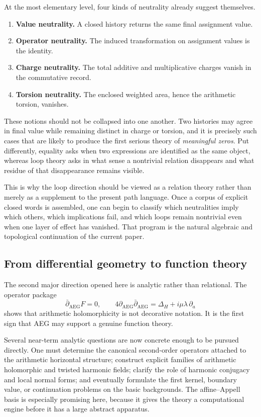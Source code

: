 At the most elementary level, four kinds of neutrality already suggest themselves.

\begin{enumerate}
    \item \textbf{Value neutrality.} A closed history returns the same final assignment value.
    \item \textbf{Operator neutrality.} The induced transformation on assignment values is the identity.
    \item \textbf{Charge neutrality.} The total additive and multiplicative charges vanish in the commutative record.
    \item \textbf{Torsion neutrality.} The enclosed weighted area, hence the arithmetic torsion, vanishes.
\end{enumerate}

These notions should not be collapsed into one another. Two histories may agree in final value while remaining distinct in charge or torsion, and it is precisely such cases that are likely to produce the first serious theory of \emph{meaningful zeros}. Put differently, equality asks when two expressions are identified as the same object, whereas loop theory asks in what sense a nontrivial relation disappears and what residue of that disappearance remains visible.

This is why the loop direction should be viewed as a relation theory rather than merely as a supplement to the present path language. Once a corpus of explicit closed words is assembled, one can begin to classify which neutralities imply which others, which implications fail, and which loops remain nontrivial even when one layer of effect has vanished. That program is the natural algebraic and topological continuation of the current paper.

\subsection{From differential geometry to function theory}

The second major direction opened here is analytic rather than relational. The operator package
\[
\bar\partial_{\mathrm{AEG}}F=0,
\qquad
4\partial_{\mathrm{AEG}}\bar\partial_{\mathrm{AEG}}
=
\Delta_H+i\mu\lambda\,\partial_a
\]
shows that arithmetic holomorphicity is not decorative notation. It is the first sign that AEG may support a genuine function theory.

Several near-term analytic questions are now concrete enough to be pursued directly. One must determine the canonical second-order operators attached to the arithmetic horizontal structure; construct explicit families of arithmetic holomorphic and twisted harmonic fields; clarify the role of harmonic conjugacy and local normal forms; and eventually formulate the first kernel, boundary value, or continuation problems on the basic backgrounds. The affine--Appell basis is especially promising here, because it gives the theory a computational engine before it has a large abstract apparatus.

